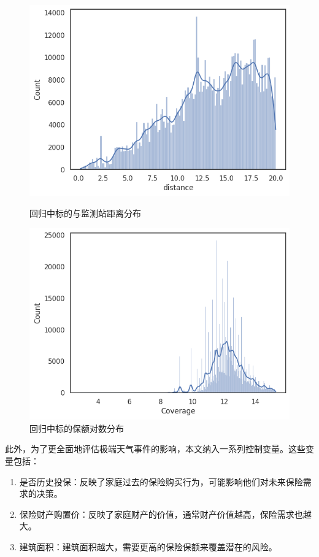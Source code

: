 \begin{figure}[H]
    \begin{minipage}{0.48\linewidth}
        \includegraphics[width=\linewidth]{lib/img/olsdistance.png}
        \caption{回归中标的与监测站距离分布}
    \end{minipage}
    \begin{minipage}{0.48\linewidth}
        \includegraphics[width=\linewidth]{lib/img/coverage.png}
        \caption{回归中标的保额对数分布}
    \end{minipage}
\end{figure}

此外，为了更全面地评估极端天气事件的影响，本文纳入一系列控制变量。这些变量包括：
\begin{enumerate}
    \item 是否历史投保：反映了家庭过去的保险购买行为，可能影响他们对未来保险需求的决策。
    \item 保险财产购置价：反映了家庭财产的价值，通常财产价值越高，保险需求也越大。
    \item 建筑面积：建筑面积越大，需要更高的保险保额来覆盖潜在的风险。
\end{enumerate}


